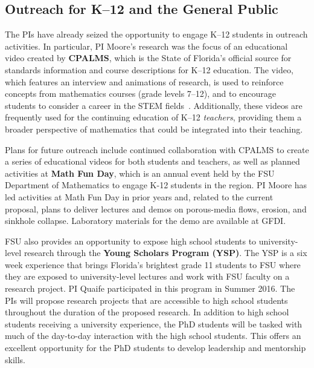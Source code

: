 \documentclass[11pt]{article}
\begin{document}
\subsection{Outreach for K--12 and the General Public}
The PIs have already seized the opportunity to engage K--12 students in outreach activities. In particular, PI Moore's research was the focus of an educational video created by {\bf CPALMS}, which is the State of Florida's official source for standards information and course descriptions for K--12 education. The video, which features an interview and animations of research, is used to reinforce concepts from mathematics courses (grade levels 7--12), and to encourage students to consider a career in the STEM fields~\cite{CPALMS}. Additionally, these videos are frequently used for the continuing education of K--12 {\em teachers}, providing them a broader perspective of mathematics that could be integrated into their teaching.
 
Plans for future outreach include continued collaboration with CPALMS to create a series of educational videos for both students and teachers, as well as planned activities at {\bf Math Fun Day}, which is an annual event held by the FSU Department of Mathematics to engage K-12 students in the region. PI Moore has led activities at Math Fun Day in prior years and, related to the current proposal, plans to deliver lectures and demos on porous-media flows, erosion, and sinkhole collapse. Laboratory materials for the demo are available at GFDI.

FSU also provides an opportunity to expose high school students to university-level research through the {\bf Young Scholars Program (YSP)}. The YSP is a six week experience that brings Florida's brightest grade 11 students to FSU where they are exposed to university-level lectures and work with FSU faculty on a research project. PI Quaife participated in this program in Summer 2016. The PIs will propose research projects that are accessible to high school students throughout the duration of the proposed research. In addition to high school students receiving a university experience, the PhD students will be tasked with much of the day-to-day interaction with the high school students. This offers an excellent opportunity for the PhD students to develop leadership and mentorship skills.


\newpage
\setcounter{page}{1}

%

\end{document}
